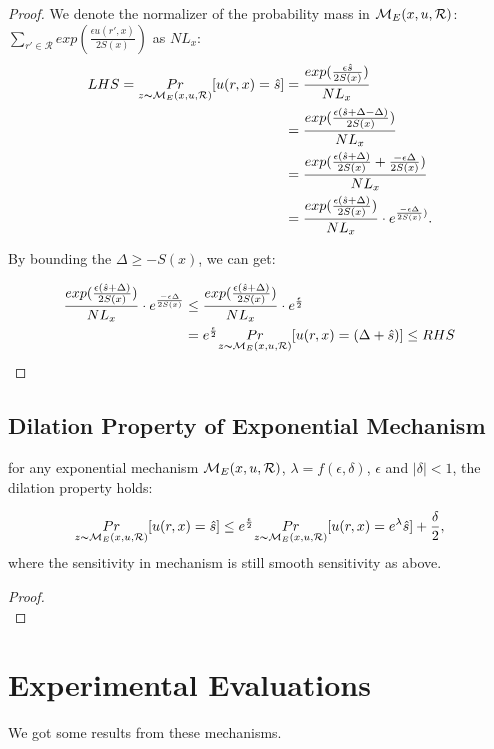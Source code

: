 \begin{proof}
We denote the normalizer of the probability mass in $\mathcal{M}_E(x, u, \mathcal{R})$: $\sum_{r' \in \mathcal{R}}exp(\frac{\epsilon u(r',x)}{2 S(x)})$ as $NL_x$:
\begin{equation*}
\begin{split}
LHS 
  = \underset{z \thicksim \mathcal{M}_E(x, u, \mathcal{R})}{Pr}[u(r,x) = \hat{s}]
& = \frac{exp(\frac{\epsilon \hat{s}}{2 S(x)})}{NL_x}\\
& = \frac{exp(\frac{\epsilon (\hat{s} + \Delta - \Delta)}{2 S(x)})}{NL_x}\\
& = \frac{exp(\frac{\epsilon (\hat{s} + \Delta)}{2 S(x)} + \frac{- \epsilon \Delta}{2 S(x)})}{NL_x}\\
& = \frac{exp(\frac{\epsilon (\hat{s} + \Delta)}{2 S(x)})}{NL_x} \cdot e^{\frac{- \epsilon \Delta}{2 S(x)})}.\\
\end{split}
\end{equation*}

By bounding the $\Delta \geq -S(x)$, we can get:

\begin{equation*}
\begin{split}
\frac{exp(\frac{\epsilon (\hat{s} + \Delta)}{2 S(x)})}{NL_x} \cdot e^{\frac{- \epsilon \Delta}{2 S(x)}}
& \leq \frac{exp(\frac{\epsilon (\hat{s} + \Delta)}{2 S(x)})}{NL_x} \cdot e^{\frac{\epsilon}{2}}\\
&  =  e^{\frac{\epsilon}{2}} \underset{z \thicksim \mathcal{M}_E(x, u, \mathcal{R})}{Pr}[u(r,x) = (\Delta + \hat{s})] \leq RHS\\
\end{split}
\end{equation*}

\end{proof}

\subsection{Dilation Property of Exponential Mechanism}
\begin{lem}
for any exponential mechanism $\mathcal{M}_E(x, u, \mathcal{R})$, $\lambda = f(\epsilon, \delta)$, $\epsilon$ and $|\delta| < 1$, the dilation property holds:

\begin{equation*}
\underset{z \thicksim \mathcal{M}_E(x, u, \mathcal{R})}{Pr}[u(r,x) = \hat{s}]
\leq
e^{\frac{\epsilon}{2}} \underset{z \thicksim \mathcal{M}_E(x, u, \mathcal{R})}{Pr}[u(r,x) = e^{\lambda} \hat{s}] + \frac{\delta}{2},
\end{equation*}
where the sensitivity in mechanism is still smooth sensitivity as above.
\end{lem}

\begin{proof}

\begin{equation*}
\end{equation*}

\end{proof}

\section{Experimental Evaluations}
We got some results from these mechanisms.

% 
% 




